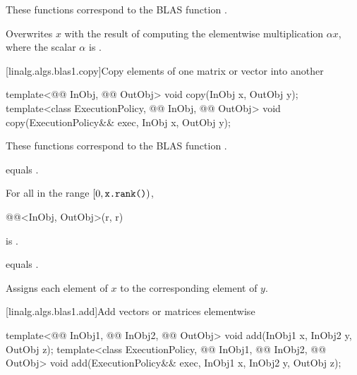 \begin{itemdescr}
\pnum
\begin{note}
These functions correspond to the BLAS function \supercite{blas1}.
\end{note}

\pnum
\effects
Overwrites $x$ with the result of
computing the elementwise multiplication $\alpha x$,
where the scalar $\alpha$ is .
\end{itemdescr}

[linalg.algs.blas1.copy]{Copy elements of one matrix or vector into another}

%
\begin{itemdecl}
template<@@ InObj, @@ OutObj>
  void copy(InObj x, OutObj y);
template<class ExecutionPolicy, @@ InObj, @@ OutObj>
  void copy(ExecutionPolicy&& exec, InObj x, OutObj y);
\end{itemdecl}

\begin{itemdescr}
\pnum
\begin{note}
These functions correspond to the BLAS function .
\end{note}

\pnum
\constraints
{} equals .

\pnum
\mandates
For all  in the range $[ 0, \texttt{\protect x.rank()})$,
\begin{codeblock}
@@<InObj, OutObj>(r, r)
\end{codeblock}
is .

\pnum
\expects
{} equals .

\pnum
\effects
Assigns each element of $x$ to the corresponding element of $y$.
\end{itemdescr}

[linalg.algs.blas1.add]{Add vectors or matrices elementwise}

%
\begin{itemdecl}
template<@@ InObj1, @@ InObj2, @@ OutObj>
  void add(InObj1 x, InObj2 y, OutObj z);
template<class ExecutionPolicy, @@ InObj1, @@ InObj2, @@ OutObj>
  void add(ExecutionPolicy&& exec,
           InObj1 x, InObj2 y, OutObj z);
\end{itemdecl}


